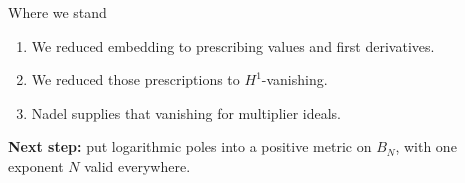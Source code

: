 \begin{frame}{Where we stand}
\begin{enumerate}
\setlength{\itemsep}{13pt}
\item We reduced embedding to prescribing values and first derivatives.
\item We reduced those prescriptions to \(H^1\)-vanishing.
\item Nadel supplies that vanishing for multiplier ideals.
\end{enumerate}
\par\bigskip
\textbf{Next step:} put logarithmic poles into a positive metric on \(B_N\), with one exponent \(N\) valid everywhere.
\end{frame}

